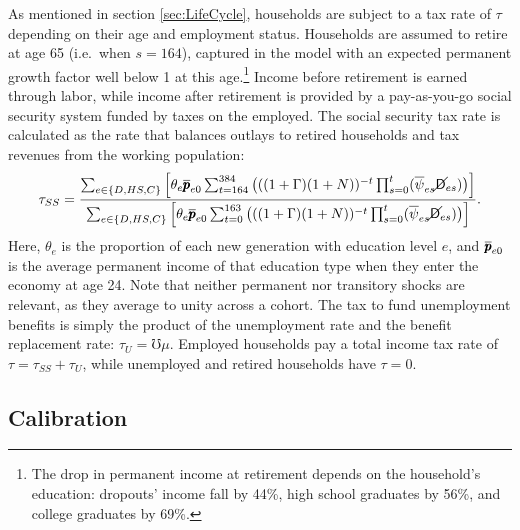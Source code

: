 \documentclass[12pt,titlepage]{econtex}
\renewcommand{\urate}{\ensuremath{\mho}}
\begin{document}
As mentioned in section \ref{sec:LifeCycle}, households are subject to a tax rate of $\tau$ depending on their age and employment status.  Households are assumed to retire at age 65 (i.e.\ when $s = 164$), captured in the model with an expected permanent growth factor well below 1 at this age.\footnote{The drop in permanent income at retirement depends on the household's education: dropouts' income fall by 44\%, high school graduates by 56\%, and college graduates by 69\%.}  Income before retirement is earned through labor, while income after retirement is provided by a pay-as-you-go social security system funded by taxes on the employed.  The social security tax rate is calculated as the rate that balances outlays to retired households and tax revenues from the working population:
\begin{equation*}
  \tau_{SS} = \frac{\sum_{e \in \{D,HS,C\}} \Big[ \theta_e \overline{\pmb{p}}_{e0} \sum_{t = 164}^{384} \big( ((1 + \Gamma)(1+N))^{-t} \prod_{s=0}^t ( \overline{\psi}_{es} \cancel{\mathsf{D}}_{es} ) \big) \Big]}
  {\sum_{e \in \{D,HS,C\}} \Big[ \theta_e \overline{\pmb{p}}_{e0} \sum_{t = 0}^{163} \big( ((1 + \Gamma)(1+N) )^{-t} \prod_{s=0}^t ( \overline{\psi}_{es} \cancel{\mathsf{D}}_{es} ) \big) \Big]}.
\end{equation*}
Here, $\theta_e$ is the proportion of each new generation with education level $e$, and $\overline{\pmb{p}}_{e0}$ is the average permanent income of that education type when they enter the economy at age 24.  Note that neither permanent nor transitory shocks are relevant, as they average to unity across a cohort.  The tax to fund unemployment benefits is simply the product of the unemployment rate and the benefit replacement rate: $\tau_U = \urate \mu$.  Employed households pay a total income tax rate of $\tau = \tau_{SS} + \tau_U$, while unemployed and retired households have $\tau = 0$.

\subsection{Calibration}
\end{document}
